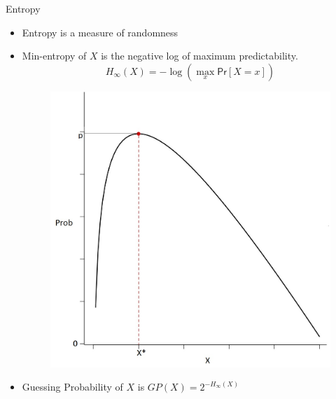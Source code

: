 \documentclass{beamer}
\begin{document}
\begin{frame}{Entropy}
	\begin{itemize}
		\setlength\itemsep{1em}
		\item Entropy is a measure of randomness
		\item Min-entropy of $X$ is the negative log of maximum predictability.
		\begin{equation*}
		    H_{\infty}(X) = - \log \left( \max\limits_{x} \mathsf{Pr} \left[ X=x \right] \right)
		\end{equation*}
		\begin{figure}
		    \includegraphics[scale=0.2]{min_entropy}
		\end{figure}
		\item Guessing Probability of $X$ is $GP(X)=2^{-H_{\infty}(X)}$
	\end{itemize}
\end{frame}

\end{document}
